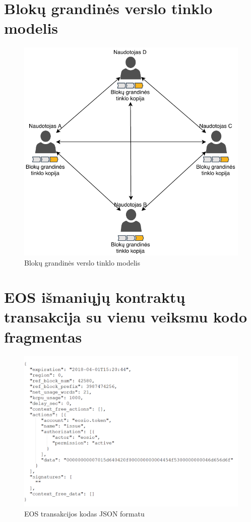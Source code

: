 \documentclass{VUMIFPSkursinis}
\begin{document}
\section{Blokų grandinės verslo tinklo modelis}
\begin{figure}[H]
    \centering
    \includegraphics[scale=0.9]{img/pav-2.pdf}
    \caption{Blokų grandinės verslo tinklo modelis}
    \label{img:pav-2}
\end{figure}

\section{EOS išmaniųjų kontraktų transakcija su vienu veiksmu kodo fragmentas}
\begin{figure}[H]
    \centering
    \includegraphics[scale=0.55]{img/pav-4.pdf}
    \caption{EOS transakcijos kodas JSON formatu}
    \label{img:pav-4}
\end{figure}
\end{document}
